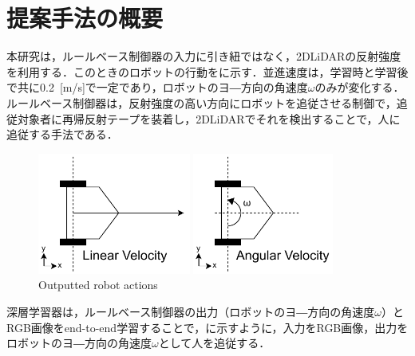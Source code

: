 
\section{提案手法の概要}

  本研究は，ルールベース制御器の入力に引き紐ではなく，2DLiDARの反射強度を利用する．このときのロボットの行動をに示す．並進速度は，学習時と学習後で共に0.2 \,[m/s]で一定であり，ロボットのヨ―方向の角速度$\omega$のみが変化する．ルールベース制御器は，反射強度の高い方向にロボットを追従させる制御で，追従対象者に再帰反射テープを装着し，2DLiDARでそれを検出することで，人に追従する手法である．

  \vspace{0.5cm}

  \begin{figure}[h]
    \centering
    \begin{minipage}[c]{65mm} 
        \centering
        \includegraphics[height=40mm]{images/pdf/RobotGuidance_linear_velocity}
    \end{minipage}
    \begin{minipage}[c]{65mm} 
        \centering
        \includegraphics[height=40mm]{images/pdf/RobotGuidance_angular_velocity}
    \end{minipage}
    \caption{Outputted robot actions}
    \label{Fig:RobotGuidance_velocity}
  \end{figure}

\newpage

  深層学習器は，ルールベース制御器の出力（ロボットのヨ―方向の角速度$\omega$）とRGB画像をend-to-end学習することで，に示すように，入力をRGB画像，出力をロボットのヨ―方向の角速度$\omega$として人を追従する．

